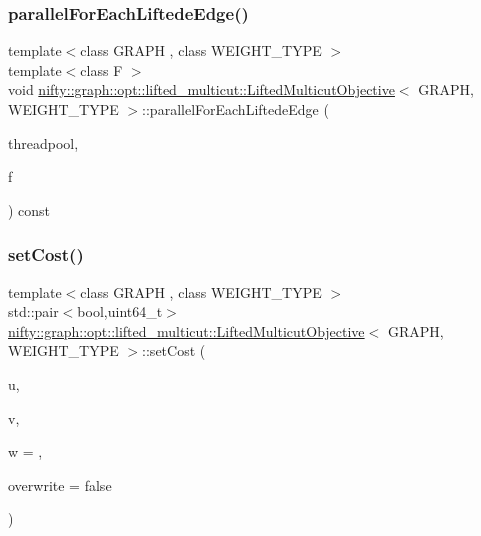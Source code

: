 \subsubsection{\texorpdfstring{parallel\+For\+Each\+Liftede\+Edge()}{parallelForEachLiftedeEdge()}}
{\footnotesize\ttfamily template$<$class G\+R\+A\+PH , class W\+E\+I\+G\+H\+T\+\_\+\+T\+Y\+PE $>$ \\
template$<$class F $>$ \\
void \hyperlink{classnifty_1_1graph_1_1opt_1_1lifted__multicut_1_1LiftedMulticutObjective}{nifty\+::graph\+::opt\+::lifted\+\_\+multicut\+::\+Lifted\+Multicut\+Objective}$<$ G\+R\+A\+PH, W\+E\+I\+G\+H\+T\+\_\+\+T\+Y\+PE $>$\+::parallel\+For\+Each\+Liftede\+Edge (\begin{DoxyParamCaption}\item[{\hyperlink{classnifty_1_1parallel_1_1ThreadPool}{parallel\+::\+Thread\+Pool} \&}]{threadpool,  }\item[{F \&\&}]{f }\end{DoxyParamCaption}) const\hspace{0.3cm}{\ttfamily [inline]}}

\mbox{\label{classnifty_1_1graph_1_1opt_1_1lifted__multicut_1_1LiftedMulticutObjective_ace9967d2de2017378d8733bba631f120}} 
\subsubsection{\texorpdfstring{set\+Cost()}{setCost()}}
{\footnotesize\ttfamily template$<$class G\+R\+A\+PH , class W\+E\+I\+G\+H\+T\+\_\+\+T\+Y\+PE $>$ \\
std\+::pair$<$bool,uint64\+\_\+t$>$ \hyperlink{classnifty_1_1graph_1_1opt_1_1lifted__multicut_1_1LiftedMulticutObjective}{nifty\+::graph\+::opt\+::lifted\+\_\+multicut\+::\+Lifted\+Multicut\+Objective}$<$ G\+R\+A\+PH, W\+E\+I\+G\+H\+T\+\_\+\+T\+Y\+PE $>$\+::set\+Cost (\begin{DoxyParamCaption}\item[{const uint64\+\_\+t}]{u,  }\item[{const uint64\+\_\+t}]{v,  }\item[{const \hyperlink{classnifty_1_1graph_1_1opt_1_1lifted__multicut_1_1LiftedMulticutObjective_a75ee804d11d3547f9985816c6805e6a8}{Weight\+Type} \&}]{w = {},  }\item[{const bool}]{overwrite = {\ttfamily false} }\end{DoxyParamCaption})\hspace{0.3cm}{\ttfamily [inline]}}

